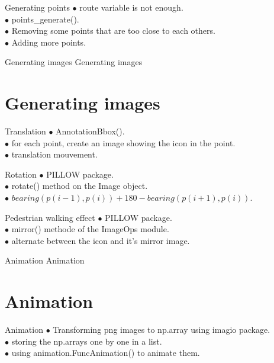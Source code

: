 \documentclass[11pt, compress]{beamer}
\theoremstyle{definition}
\begin{document}
\begin{frame}{Generating points}
    $\bullet$ route variable is not enough.\\
    $\bullet$ points\_generate().\\
    $\bullet$ Removing some points that are too close to each others. \\
    $\bullet$ Adding more points.
\end{frame}

\begin{frame}{Generating images}
\center \Large \Huge Generating images
\section{Generating images}
\end{frame} 


\begin{frame}{Translation}
	$\bullet$ AnnotationBbox().\\
    $\bullet$ for each point, create an image showing the icon in the point.\\
    $\bullet$ translation mouvement. \\
\end{frame} 


\begin{frame}{Rotation}
	$\bullet$ PILLOW package.\\
    $\bullet$ rotate() method on the Image object.\\
    $\bullet$ $bearing(p(i-1), p(i)) + 180 - bearing(p(i+1), p(i)).$ \\
\end{frame} 



\begin{frame}{Pedestrian walking effect}
	$\bullet$ PILLOW package.\\
    $\bullet$ mirror() methode of the ImageOps module.\\
    $\bullet$ alternate between the icon and it's mirror image. \\
\end{frame} 

\begin{frame}{Animation}
\center \Large \Huge Animation
\section{Animation}
\end{frame} 

\begin{frame}{Animation}
	$\bullet$ Transforming png images to np.array using imagio package.\\
    $\bullet$ storing the np.arrays one by one in a list.\\
    $\bullet$ using animation.FuncAnimation() to animate them. \\
\end{frame} 
\end{document}
